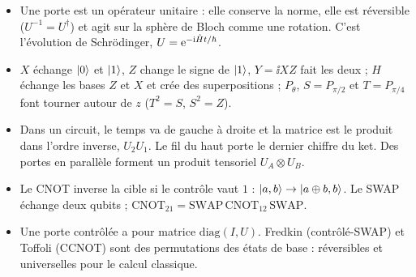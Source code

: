\begin{aretenir}
\begin{itemize}
  \item Une porte est un opérateur unitaire : elle conserve la norme, elle est réversible
        ($U^{-1}=U^\dagger$) et agit sur la sphère de Bloch comme une rotation. C'est l'évolution de
        Schrödinger, $U=\mathrm{e}^{-\mathrm{i}\hat{H} t/\hbar}$.
  \item $X$ échange $|0\rangle$ et $|1\rangle$, $Z$ change le signe de $|1\rangle$, $Y=\ii XZ$ fait les deux ;
        $H$ échange les bases $Z$ et $X$ et crée des superpositions ; $P_\theta$, $S=P_{\pi/2}$ et
        $T=P_{\pi/4}$ font tourner autour de $z$ ($T^2=S$, $S^2=Z$).
  \item Dans un circuit, le temps va de gauche à droite et la matrice est le produit dans l'ordre
        inverse, $U_2U_1$. Le fil du haut porte le dernier chiffre du ket. Des portes en parallèle
        forment un produit tensoriel $U_A\otimes U_B$.
  \item Le CNOT inverse la cible si le contrôle vaut $1$ : $|a,b\rangle\to|a\oplus b,b\rangle$. Le SWAP
        échange deux qubits ; $\mathrm{CNOT}_{21}=\mathrm{SWAP}\,\mathrm{CNOT}_{12}\,\mathrm{SWAP}$.
  \item Une porte contrôlée a pour matrice $\mathrm{diag}(I,U)$. Fredkin (contrôlé-SWAP) et
        Toffoli (CCNOT) sont des permutations des états de base : réversibles et universelles
        pour le calcul classique.
\end{itemize}
\end{aretenir}

